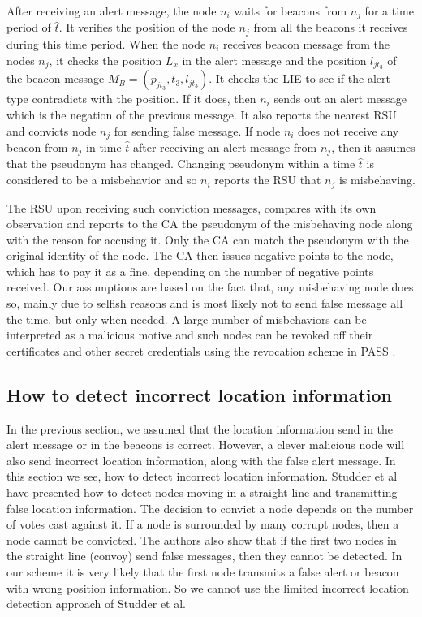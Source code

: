 \documentclass[conference]{IEEEtran}[10pt]
\begin{document}
After receiving an alert message, the node $n_i$ waits for beacons from $n_j$ for a  time period of $\hat{t}$. 
It verifies the position of the node $n_j$ from all the beacons it receives during this time period. 
When the node $n_i$  receives beacon message from the nodes $n_j$, 
it checks the position $L_x$ in the alert message
and the position $l_{jt_3}$ of the beacon message $M_B = (p_{jt_3}, t_3, l_{jt_3})$. 
It checks the LIE to see if the alert type contradicts with the position. 
If it does, then $n_i$ sends out an alert message which is the negation of the previous message. 
It also reports the nearest RSU and convicts node $n_j$ for sending false message. 
If node $n_i$ does not receive any beacon from $n_j$ in time $\hat{t}$ after receiving an alert message from $n_j$, 
then it assumes that the pseudonym has changed.
Changing pseudonym within a time $\hat{t}$ is considered to be a misbehavior and so $n_i$ reports the RSU that $n_j$ is misbehaving. 

The RSU upon receiving such conviction messages, compares with its own observation and reports
to the CA the pseudonym of the misbehaving node along with the reason for accusing it.  
Only the CA can match the pseudonym with the original identity of the node. 
The CA then  issues negative points to the node, which has to pay it as a fine, depending on the number of negative points received. 
Our assumptions are based on the fact that, any misbehaving node does so, mainly due to  selfish reasons and is most likely 
not to send false message all the time, but only when needed. 
A large number of misbehaviors can be interpreted as a malicious motive and such nodes can be revoked off their certificates and
other secret credentials using the revocation scheme in PASS \cite{SLLSS10}.  




\subsection{How to detect incorrect location information}
In the previous section, we assumed that the location information send in the alert message or in the beacons is correct.
However, a clever malicious node will also send incorrect location information, along with the false alert message. 
In this section we see, how to detect incorrect location information. 
Studder et al \cite{SLP07} have presented how to detect nodes moving in a straight line  
and transmitting false location information.
The decision to convict a node depends on the number of votes  cast against it. 
If a node is surrounded by many corrupt nodes, then a node cannot be convicted. 
The authors also show that if the first two nodes in the straight line (convoy) send false messages, 
then they cannot be detected. 
In our scheme it is very likely that the first node transmits a false alert or beacon with wrong position information. 
So we cannot use the limited incorrect location detection approach of Studder et al. 
\end{document}
